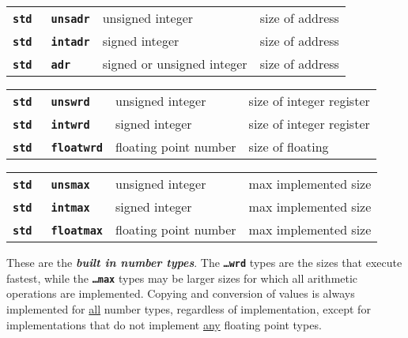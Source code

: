 \documentclass[12pt]{article}
\makeatletter
\newcommand{\TT}[1]{{\tt \bfseries #1}}
\newcommand{\key}[1]{{\bf \em #1}\index{#1}}
\newcommand{\ttkey}[1]{\TT{#1}\index{#1@{\tt #1}}}
\newenvironment{indpar}[1][0.3in]%
	{\begin{list}{}%
		     {\setlength{\itemsep}{0in}%
		      \setlength{\topsep}{0in}%
		      \setlength{\parsep}{1ex}%
		      \setlength{\labelwidth}{#1}%
		      \setlength{\leftmargin}{#1}%
		      \addtolength{\leftmargin}{\labelsep}}%
	 \item}%
	{\end{list}}
\makeatother
\begin{document}
\begin{indpar}
\begin{tabular}{p{1.5in}@{~~~~~~}p{2in}@{~~~~~~}l}
\TT{std}~~~\ttkey{unsadr}	& unsigned integer & size of address \\
\TT{std}~~~\ttkey{intadr}	& signed integer & size of address \\
\TT{std}~~~\ttkey{adr}		& signed or unsigned integer
                                & size of address \\
\end{tabular}

\begin{tabular}{p{1.5in}@{~~~~~~}p{2in}@{~~~~~~}l}
\TT{std}~~~\ttkey{unswrd}	& unsigned integer & size of integer register \\
\TT{std}~~~\ttkey{intwrd}	& signed integer & size of integer register \\
\TT{std}~~~\ttkey{floatwrd}	& floating point number & size of floating
\end{tabular}

\begin{tabular}{p{1.5in}@{~~~~~~}p{2in}@{~~~~~~}l}
\TT{std}~~~\ttkey{unsmax}	& unsigned integer & max implemented size \\
\TT{std}~~~\ttkey{intmax}	& signed integer & max implemented size \\
\TT{std}~~~\ttkey{floatmax}	& floating point number & max implemented size
\end{tabular}

\end{indpar}

These are the \key{built in number types}.  The \TT{\ldots{}wrd} types
are the sizes that execute fastest, while the \TT{\ldots{}max} types
may be larger sizes for which all arithmetic operations are implemented.
Copying and conversion of values is always implemented for
\underline{all}
number types, regardless of implementation, except for implementations
that do not implement \underline{any} floating point types.
\end{document}
